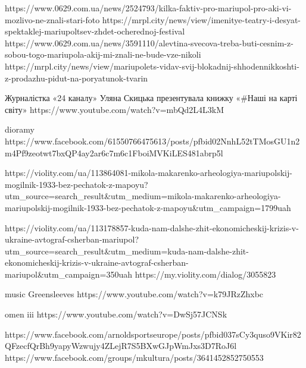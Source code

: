 % 
https://www.0629.com.ua/news/2524793/kilka-faktiv-pro-mariupol-pro-aki-vi-mozlivo-ne-znali-stari-foto
https://mrpl.city/news/view/imenitye-teatry-i-desyat-spektaklej-mariupoltsev-zhdet-ocherednoj-festival
https://www.0629.com.ua/news/3591110/alevtina-svecova-treba-buti-cesnim-z-sobou-togo-mariupola-akij-mi-znali-ne-bude-vze-nikoli
https://mrpl.city/news/view/mariupolets-vidav-svij-blokadnij-shhodennikkoshti-z-prodazhu-pidut-na-poryatunok-tvarin

 Журналістка «24 каналу» Уляна Скицька презентувала книжку «#Наші на карті світу» 
https://www.youtube.com/watch?v=mbQd2L4L3kM

dioramy
https://www.facebook.com/61550766475613/posts/pfbid02NnhL52tTMosGU1n2m4Pf9zeotwt7bxQP4ay2ar6c7m6c1FboiMVKiLES481abrp5l

https://violity.com/ua/113864081-mikola-makarenko-arheologiya-mariupolskij-mogilnik-1933-bez-pechatok-z-mapoyu?utm_source=search_result&utm_medium=mikola-makarenko-arheologiya-mariupolskij-mogilnik-1933-bez-pechatok-z-mapoyu&utm_campaign=1799uah

https://violity.com/ua/113178857-kuda-nam-dalshe-zhit-ekonomicheskij-krizis-v-ukraine-avtograf-csherban-mariupol?utm_source=search_result&utm_medium=kuda-nam-dalshe-zhit-ekonomicheskij-krizis-v-ukraine-avtograf-csherban-mariupol&utm_campaign=350uah
https://my.violity.com/dialog/3055823

music
Greensleeves
https://www.youtube.com/watch?v=k79JRzZhxbc

omen iii
https://www.youtube.com/watch?v=DwSj57JCNSk


https://www.facebook.com/arnoldsportseurope/posts/pfbid037sCy3quso9VKir82QFzecfQrBh9yapyWzwujy4ZLejR7S5BXwGJpWmJxs3D7RoJ6l
https://www.facebook.com/groups/mkultura/posts/3641452852750553
